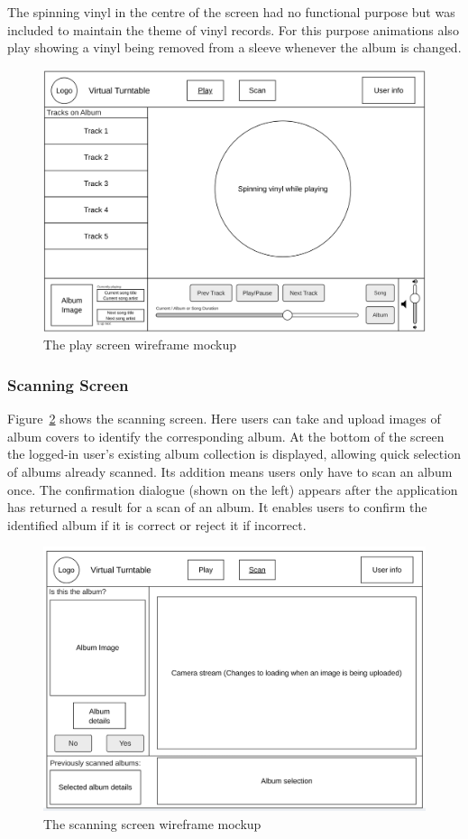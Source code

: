 The spinning vinyl in the centre of the screen had no functional purpose but was included to maintain the theme of vinyl records. For this purpose animations also play showing a vinyl being removed from a sleeve whenever the album is changed.
\begin{figure} [H]
    \centering
    \includegraphics[width=0.6\linewidth]{figures/play_screen_mockup.png}
    \caption{The play screen wireframe mockup}
    \label{fig:play_screen_mockup}
\end{figure}

\subsubsection{Scanning Screen}
Figure~\ref{fig:scan_screen_mockup} shows the scanning screen. Here users can take and upload images of album covers to identify the corresponding album.
At the bottom of the screen the logged-in user’s existing album collection is displayed, allowing quick selection of albums already scanned. Its addition means users only have to scan an album once.
The confirmation dialogue (shown on the left) appears after the application has returned a result for a scan of an album. It enables users to confirm the identified album if it is correct or reject it if incorrect.

\begin{figure} [H]
    \centering
    \includegraphics[width=0.6\linewidth]{figures/scan_screen_mockup.png}
    \caption{The scanning screen wireframe mockup}
    \label{fig:scan_screen_mockup}
\end{figure}


